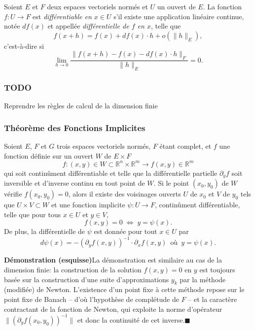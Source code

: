 \documentclass[french,]{article}
\begin{document}
Soient \(E\) et \(F\) deux espaces vectoriels normés et \(U\) un ouvert
de \(E\). La fonction \(f: U \to F\) est \emph{différentiable en
\(x \in U\)} s'il existe une application linéaire continue, notée
\(df(x)\) et appellée \emph{différentielle de \(f\) en \(x\)}, telle que
\[
f(x+h) = f(x) + df(x) \cdot h + o(\|h\|_E),
\] c'est-à-dire si \[
\lim_{h \to 0} \frac{\|f(x+h) - f(x) - df(x) \cdot h\|_F}{\|h\|_E} = 0.
\]

\hypertarget{todo}{%
\subsubsection{TODO}\label{todo}}

Reprendre les règles de calcul de la dimension finie

\hypertarget{TFI-2}{%
\subsubsection{Théorème des Fonctions Implicites}\label{TFI-2}}

Soient \(E\), \(F\) et \(G\) trois espaces vectoriels normés, \(F\)
étant complet, et \(f\) une fonction définie sur un ouvert \(W\) de
\(E \times F\) \[
f: (x, y) \in W \subset \mathbb{R}^n \times \mathbb{R}^m \to f(x, y) \in \mathbb{R}^m
\] qui soit continûment différentiable et telle que la différentielle
partielle \(\partial_y f\) soit inversible et d'inverse continu en tout
point de \(W\). Si le point \((x_0, y_0)\) de \(W\) vérifie
\(f(x_0, y_0)= 0\), alors il existe des voisinages ouverts \(U\) de
\(x_0\) et \(V\) de \(y_0\) tels que \(U \times V \subset W\) et une
fonction implicite \(\psi: U \to F\), continûment différentiable, telle
que pour tous \(x \in U\) et \(y \in V\), \[
f(x, y) = 0
\; \Leftrightarrow \; 
y = \psi(x).
\] De plus, la différentielle de \(\psi\) est donnée pour tout
\(x \in U\) par \[
d \psi(x) = - (\partial_y f(x, y))^{-1} \cdot \partial_x f(x, y) \, \mbox{ où } \, y=\psi(x).
\]

\vspace{3.25ex plus 1ex minus .2ex}\protect\hypertarget{duxe9monstration-esquisse}{}{\textbf{Démonstration
(esquisse)}\quad}La démonstration est similaire au cas de la dimension
finie: la construction de la solution \(f(x, y) = 0\) en \(y\) est
toujours basée sur la construction d'une suite d'approximations \(y_k\)
par la méthode (modifiée) de Newton. L'existence d'un point fixe à cette
méthode repose sur le point fixe de Banach -- d'où l'hypothèse de
complétude de \(F\) -- et la caractère contractant de la fonction de
Newton, qui exploite la norme d'opérateur
\(\|(\partial_y f(x_0, y_0))^{-1}\|\) et donc la continuité de cet
inverse.\hfill$\blacksquare$
\end{document}
